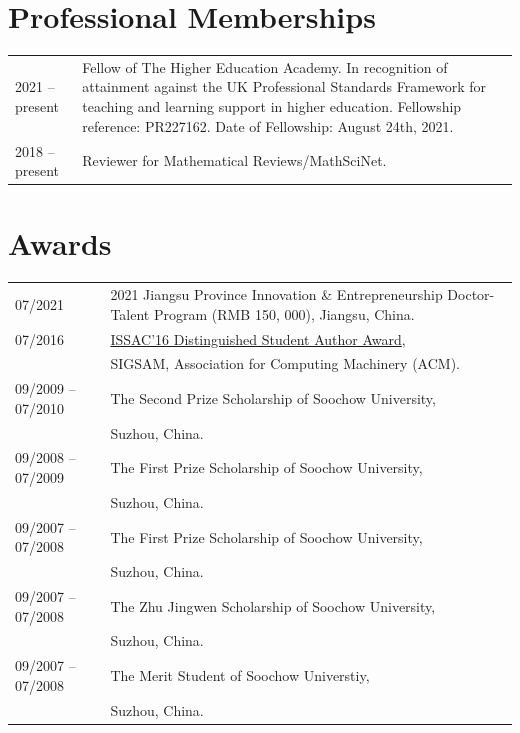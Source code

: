 \documentclass[a4paper,12pt]{article}
\begin{document}
\section*{\Large{Professional Memberships}}
\begin{tabular}{@{}p{1.4in}p{4in}} 
2021 -- present & Fellow of The Higher Education Academy. 
In recognition of attainment against the UK
Professional Standards Framework for teaching and learning support in higher education.
Fellowship reference: PR227162. Date of Fellowship: August 24th, 2021. \\
2018 -- present &  Reviewer for Mathematical Reviews/MathSciNet.            
\end{tabular}


\section*{\Large{Awards}}
\begin{longtable}{@{}p{1.4in}p{4in}}
07/2021         & 2021 Jiangsu Province Innovation \& Entrepreneurship Doctor-Talent Program (RMB 150, 000), 
                       Jiangsu, China. \\
07/2016               & \href{https://www.sigsam.org/Awards/ISSACAwards.html}{ISSAC'16 Distinguished Student Author Award}, \\
                      & SIGSAM, Association for Computing Machinery (ACM). \\
09/2009 -- 07/2010    & The Second Prize Scholarship of Soochow University, \\ 
                      & Suzhou, China.\\
09/2008 -- 07/2009    & The First Prize Scholarship of Soochow University, \\ 
                      & Suzhou, China.\\
09/2007 -- 07/2008    & The First Prize Scholarship of Soochow University, \\ 
                      & Suzhou, China.\\
09/2007 -- 07/2008    & The Zhu Jingwen Scholarship of Soochow University, \\ 
                      & Suzhou, China.\\
09/2007 -- 07/2008    & The Merit Student of Soochow Universtiy, \\ 
                      & Suzhou, China.\\
\end{longtable}
\end{document}
